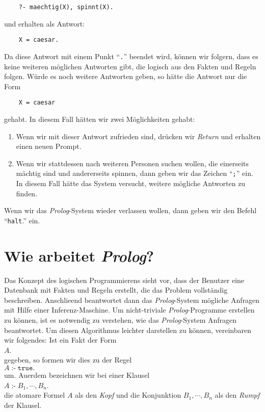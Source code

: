 \begin{verbatim}
    ?- maechtig(X), spinnt(X).
\end{verbatim}
und erhalten als Antwort:
\begin{verbatim}
    X = caesar.
\end{verbatim}
Da diese Antwort mit einem Punkt ``\texttt{.}'' beendet wird, k\"{o}nnen wir folgern, dass es keine
weiteren m\"{o}glichen Antworten gibt, die logisch aus den Fakten und Regeln folgen.  W\"{u}rde es noch
weitere Antworten geben, so h\"{a}tte die Antwort nur die Form 
\begin{verbatim}
    X = caesar
\end{verbatim}
gehabt.  In diesem Fall h\"{a}tten wir zwei M\"{o}glichkeiten gehabt:
\begin{enumerate}
\item Wenn wir mit dieser Antwort zufrieden sind, dr\"{u}cken wir \textsl{Return} und erhalten einen
      neuen Prompt.
\item Wenn wir stattdessen nach weiteren Personen suchen wollen, die einerseits
      m\"{a}chtig sind und andererseits spinnen, dann geben wir das Zeichen ``\texttt{;}'' ein.
      In diesem Fall h\"{a}tte das System versucht, weitere m\"{o}gliche Antworten zu finden.
\end{enumerate} 
Wenn wir das \textsl{Prolog}-System wieder verlassen wollen, dann geben wir den Befehl
``\texttt{halt}.'' ein.

\section{Wie arbeitet \textsl{Prolog}?}
Das Konzept des logischen Programmierens sieht vor, dass der Benutzer eine Datenbank mit
Fakten und Regeln erstellt, die das Problem vollst\"{a}ndig beschreiben.  Anschlie\3end
beantwortet dann das \textsl{Prolog}-System m\"{o}gliche Anfragen mit Hilfe einer
Inferenz-Maschine.  Um nicht-triviale \textsl{Prolog}-Programme erstellen zu k\"{o}nnen, ist es
notwendig zu verstehen, wie das \textsl{Prolog}-System Anfragen beantwortet.
Um diesen Algorithmus leichter darstellen zu k\"{o}nnen, vereinbaren wir folgendes:
Ist ein Fakt der Form \\[0.2cm]
\hspace*{1.3cm} $A$.
\\[0.2cm]
gegeben, so formen wir dies zu der Regel \\[0.2cm]
\hspace*{1.3cm} $A \;\texttt{:-}\; \texttt{true}.$ \\[0.2cm]
um.  Au\3erdem bezeichnen wir bei einer Klausel \\[0.2cm]
\hspace*{1.3cm} $A \;\texttt{:-}\; B_1, \cdots, B_n$. \\[0.2cm]
die atomare Formel $A$ als den \emph{Kopf} und die Konjunktion $B_1, \cdots, B_n$
als den \emph{Rumpf} der Klausel.
\vspace*{0.2cm}

